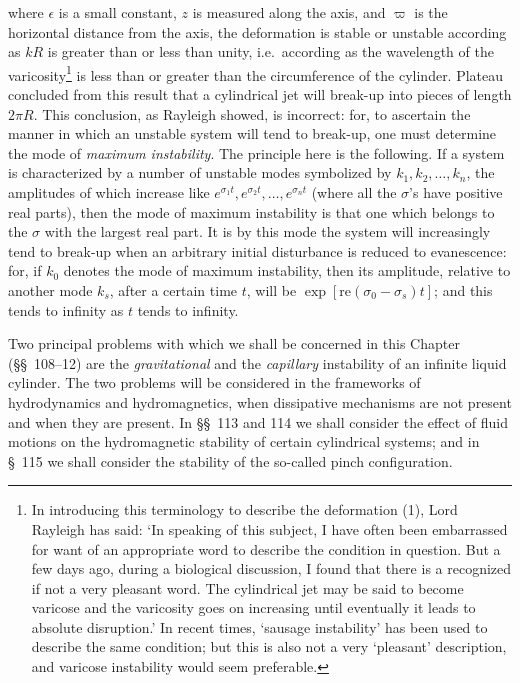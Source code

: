 where $\epsilon$ is a small constant, $z$ is measured along the axis, and $\varpi$ is the horizontal distance from the axis, the deformation is stable or unstable according as $kR$ is greater than or less than unity, i.e.\ according as the wavelength of the varicosity\footnote{In introducing this terminology to describe the deformation (1), Lord Rayleigh has said: `In speaking of this subject, I have often been embarrassed for want of an appropriate word to describe the condition in question. But a few days ago, during a biological discussion, I found that there is a recognized if not a very pleasant word. The cylindrical jet may be said to become varicose and the varicosity goes on increasing until eventually it leads to absolute disruption.' In recent times, `sausage instability' has been used to describe the same condition; but this is also not a very `pleasant' description, and varicose instability would seem preferable.} is less than or greater than the circumference of the cylinder. Plateau concluded from this result that a cylindrical jet will break-up into pieces of length $2\pi R$. This conclusion, as Rayleigh showed, is incorrect: for, to ascertain the manner in which an unstable system will tend to break-up, one must determine the mode of \emph{maximum instability}. The principle here is the following. If a system is characterized by a number of unstable modes symbolized by $k_1, k_2, \ldots, k_n$, the amplitudes of which increase like $e^{\sigma_1 t}, e^{\sigma_2 t}, \ldots, e^{\sigma_n t}$ (where all the $\sigma$'s have positive real parts), then the mode of maximum instability is that one which belongs to the $\sigma$ with the largest real part. It is by this mode the system will increasingly tend to break-up when an arbitrary initial disturbance is reduced to evanescence: for, if $k_0$ denotes the mode of maximum instability, then its amplitude, relative to another mode $k_s$, after a certain time $t$, will be $\exp[\mathrm{re}(\sigma_0 - \sigma_s)t]$; and this tends to infinity as $t$ tends to infinity.

Two principal problems with which we shall be concerned in this Chapter (\S\S~108--12) are the \emph{gravitational} and the \emph{capillary} instability of an infinite liquid cylinder. The two problems will be considered in the frameworks of hydrodynamics and hydromagnetics, when dissipative mechanisms are not present and when they are present. In \S\S~113 and 114 we shall consider the effect of fluid motions on the hydromagnetic stability of certain cylindrical systems; and in \S~115 we shall consider the stability of the so-called pinch configuration.

